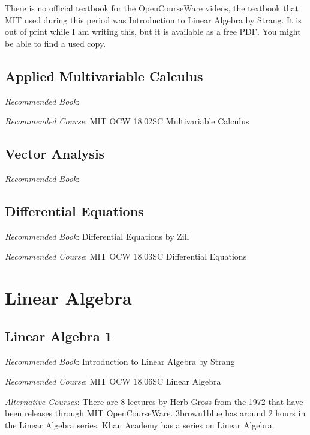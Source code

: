 \documentclass[openany,10pt]{book}
\begin{document}
\noindent There is no official textbook for the OpenCourseWare videos, the textbook that MIT used during this period was Introduction to Linear Algebra by Strang.  It is out of print while I am writing this, but it is available as a free PDF.  You might be able to find a used copy.

\chapter{Applied Multivariable Calculus}

\textit{Recommended Book}: \newline

\noindent \textit{Recommended Course}: MIT OCW 18.02SC Multivariable Calculus \newline

\chapter{Vector Analysis}

\textit{Recommended Book}: \newline

\chapter{Differential Equations}

\textit{Recommended Book}: Differential Equations by Zill\newline

\noindent \textit{Recommended Course}: MIT OCW 18.03SC Differential Equations\newline

\part{Linear Algebra}

\chapter{Linear Algebra 1}

\textit{Recommended Book}: Introduction to Linear Algebra by Strang\newline

\noindent \textit{Recommended Course}: MIT OCW 18.06SC Linear Algebra\newline

\noindent \textit{Alternative Courses}: There are 8 lectures by Herb Gross from the 1972 that have been releases through MIT OpenCourseWare.  3brown1blue has around 2 hours in the Linear Algebra series.  Khan Academy has a series on Linear Algebra.  \newline
\end{document}
